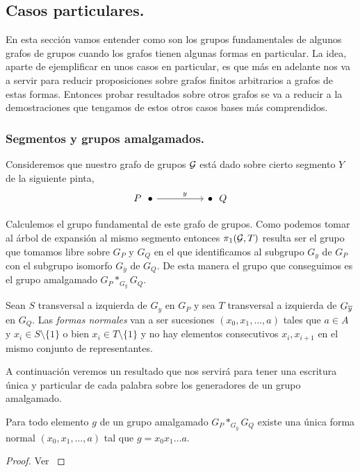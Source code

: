 \documentclass[tesis.tex]{subfiles}
\begin{document}
\subsection{Casos particulares.}

En esta sección vamos entender como son los grupos fundamentales de algunos grafos de grupos cuando los grafos tienen algunas formas en particular. 
La idea, aparte de ejemplificar en unos casos en particular, es que más en adelante nos va a servir para reducir proposiciones sobre grafos finitos arbitrarios a grafos de estas formas.
Entonces probar resultados sobre otros grafos se va a reducir a la demostraciones que tengamos de estos otros casos bases más comprendidos.

\subsubsection{Segmentos y grupos amalgamados.}
Consideremos que nuestro grafo de grupos ${\cal G}$ está dado sobre cierto segmento $Y$ de la siguiente pinta,
\[\begin{tikzcd}
	{P \ \ \bullet} && {\bullet \ \ Q}
	\arrow["y"{pos=0.6}, from=1-1, to=1-3]
\end{tikzcd}\]

Calculemos el grupo fundamental de este grafo de grupos.
Como podemos tomar al árbol de expansión al mismo segmento entonces $\pi_1({\cal G}, T)$ resulta ser el grupo que tomamos libre sobre $G_P$ y $G_Q$ en el que identificamos al subgrupo $G_y$ de $G_P$ con el subgrupo isomorfo $G_{\overline y}$ de $G_Q$.
De esta manera el grupo que conseguimos es el grupo amalgamado $G_P \ast_{G_y} G_Q$. 

Sean $S$ transversal a izquierda de $G_{y}$ en $G_P$ y sea $T$ transversal a izquierda de $G_{\overline y}$ en $G_{Q}$.
Las \emph{formas normales} van a ser sucesiones $(x_0,x_1,\dots,a)$ tales que $a \in A$ y $x_{i} \in S \setminus \{ 1 \}$ o bien $x_{i} \in T \setminus \{ 1 \}$ y no hay elementos consecutivos $x_{i}, x_{i+1}$ en el mismo conjunto de representantes.

A continuación veremos un resultado que nos servirá para tener una escritura única y particular de cada palabra sobre los generadores de un grupo amalgamado.
\begin{prop}\label{prop_amalgamado_formanormal}
	Para todo elemento $g$ de un grupo amalgamado $G_P \ast_{G_y} G_Q$ existe una única forma normal $(x_0,x_1,\dots,a)$ tal que $g= x_0x_1\dots a$.
\end{prop}
\begin{proof}
	Ver \cite{lyndon1977combinatorial}
\end{proof}
 
\end{document}
